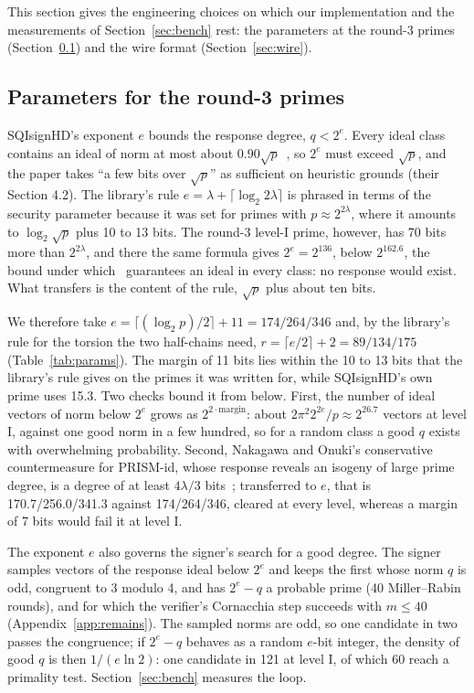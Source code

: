 \documentclass[version=preprint]{iacrcc}
\begin{document}
    This section gives the engineering choices on which our implementation
    and the measurements of Section~\ref{sec:bench} rest: the parameters at the
    round-3 primes (Section~\ref{sec:params}) and the wire format
    (Section~\ref{sec:wire}).

    \subsection{Parameters for the round-3 primes}
    \label{sec:params}
    SQIsignHD's exponent $e$ bounds the response degree, $q < 2^e$. Every
    ideal class contains an ideal of norm at most about
    $0.90\sqrt{p}$~\cite[Lemma 12]{DLRW24}, so $2^e$ must exceed $\sqrt{p}$,
    and the paper takes ``a few bits over $\sqrt{p}$'' as sufficient on
    heuristic grounds (their Section 4.2). The library's rule $e = \lambda +
    \lceil \log_2 2\lambda \rceil$ is phrased in terms of the security
    parameter because it was set for primes with $p \approx 2^{2\lambda}$,
    where it amounts to $\log_2 \sqrt{p}$ plus 10 to 13 bits. The round-3
    level-I prime, however, has 70 bits more than $2^{2\lambda}$, and there the
    same formula gives $2^e = 2^{136}$, below $2^{162.6}$, the bound under
    which~\cite[Lemma 12]{DLRW24} guarantees an ideal in every class: no response would exist.
    What transfers is the content of the rule, $\sqrt{p}$ plus about ten bits.

    We therefore take $e = \lceil (\log_2 p)/2 \rceil + 11 = 174/264/346$ and,
    by the library's rule for the torsion the two half-chains need, $r = \lceil
    e/2 \rceil + 2 = 89/134/175$ (Table~\ref{tab:params}). The margin of 11
    bits lies within the 10 to 13 bits that the library's rule gives on the
    primes it was written for, while SQIsignHD's own prime uses 15.3. Two
    checks bound it from below. First, the number of ideal vectors of norm
    below $2^e$ grows as $2^{2 \cdot \mathrm{margin}}$: about $2\pi^2
    2^{2e}/p \approx 2^{26.7}$ vectors at level I, against one good norm in
    a few hundred, so for a random class a good
    $q$ exists with overwhelming probability. Second, Nakagawa and Onuki's conservative
    countermeasure for PRISM-id, whose response reveals an isogeny of large
    prime degree, is a degree of at least $4\lambda/3$ bits~\cite[Section
    5.3]{NO25}; transferred to $e$, that is 170.7/256.0/341.3 against
    174/264/346, cleared at every level, whereas a margin of 7 bits would fail
    it at level I.

    The exponent $e$ also governs the signer's search for a good degree. The
    signer samples vectors of the response ideal below $2^e$ and keeps the
    first whose norm $q$ is odd, congruent to 3 modulo 4, and has $2^e - q$ a
    probable prime (40 Miller--Rabin rounds), and for which the verifier's
    Cornacchia step succeeds with $m \le 40$ (Appendix~\ref{app:remains}). The sampled norms are odd, so one
    candidate in two passes the congruence; if $2^e - q$ behaves as a random
    $e$-bit integer, the density of good $q$ is then $1/(e \ln 2)$: one
    candidate in 121 at level I, of which 60 reach a primality test.
    Section~\ref{sec:bench} measures the loop.
\end{document}
